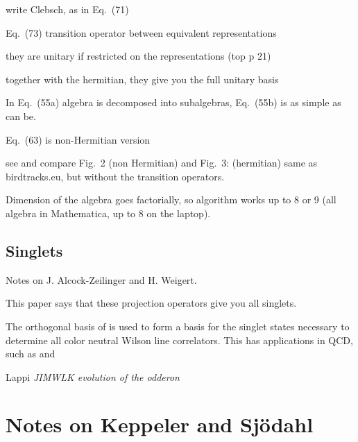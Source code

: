 write Clebsch, as in Eq.~(71)

Eq.~(73) transition operator between equivalent representations

they are unitary if restricted on the representations (top p 21)

together with the hermitian, they give you the full unitary basis

In Eq.~(55a) algebra is decomposed into subalgebras,
Eq.~(55b) is as simple as can be.

Eq.~(63) is non-Hermitian version

see and compare Fig.~2 (non Hermitian) and Fig.~3: (hermitian)
same as birdtracks.eu, but without the transition operators.

Dimension of the algebra goes factorially, so algorithm works up to 8 or 9
(all algebra in Mathematica, up to 8 on the laptop).

\subsection{Singlets}
\label{s-AlcZei16-4}


Notes on J. Alcock-Zeilinger and H. Weigert.

This paper says that these projection operators give you all singlets.

The orthogonal basis of  is used to form a basis for the
singlet states necessary to determine all color neutral Wilson line
correlators. This has applications in  QCD, such as 
and

Lappi \etal{}
{\em {JIMWLK} evolution of the odderon}



\section{Notes on Keppeler and Sj{\"o}dahl}
\label{s-KeppSjo14}

